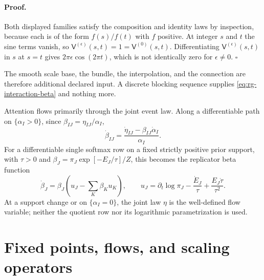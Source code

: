 \paragraph{Proof.}
Both displayed families satisfy the composition and identity laws by inspection,
because each is of the form $f(s)/f(t)$ with $f$ positive.  At integer $s$ and
$t$ the sine terms vanish, so
$\mathsf V^{(\epsilon)}(s,t)=1=\mathsf V^{(0)}(s,t)$.
Differentiating $\mathsf V^{(\epsilon)}(s,t)$ in $s$ at $s=t$ gives
$2\pi\epsilon\cos(2\pi t)$, which is not identically zero for
$\epsilon\neq0$. $\square$

The smooth scale base, the bundle, the interpolation, and the connection are
therefore additional declared input.  A discrete blocking sequence supplies
\eqref{eq:rg-interaction-beta} and nothing more. 

Attention flows primarily through the joint event law.  Along a differentiable
path on $\{\alpha_I>0\}$, since
$\beta_{IJ}=\eta_{IJ}/\alpha_I$,
\begin{equation}
\dot\beta_{IJ}
=\frac{\dot\eta_{IJ}-\beta_{IJ}\dot\alpha_I}{\alpha_I}.
\label{eq:rg-attention-beta-event}
\end{equation}
For a differentiable single softmax row on a fixed strictly positive prior
support, with $\tau>0$ and
$\beta_J=\pi_J\exp[-E_J/\tau]/Z$, this becomes the replicator beta function
\begin{equation}
\dot\beta_J=\beta_J\left(u_J-\sum_K\beta_Ku_K\right),
\qquad
u_J=\partial_t\log\pi_J-\frac{\dot E_J}{\tau}
+\frac{E_J\dot\tau}{\tau^2}.
\label{eq:rg-attention-beta-softmax}
\end{equation}
At a support change or on $\{\alpha_I=0\}$, the joint law $\eta$ is the
well-defined flow variable; neither the quotient row nor its logarithmic
parametrization is used.

\section{Fixed points, flows, and scaling operators}
\label{sec:rg-fixed-points}


